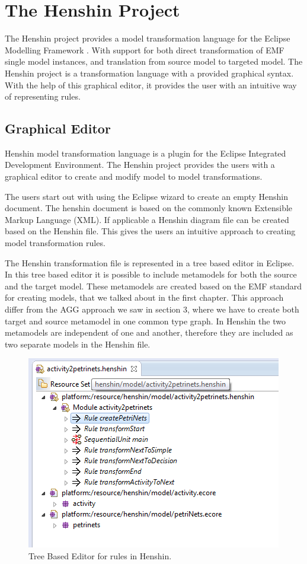 \section{The Henshin Project}

\noindent The Henshin project\cite{Henshin} provides a model transformation
language for the Eclipse Modelling Framework \cite{Steinberg2009}. With support
for both direct transformation of EMF single model instances, and translation
from source model to targeted model. The Henshin project is a transformation
language with a provided graphical syntax. With the help of this graphical
editor, it provides the user with an intuitive way of representing rules. 

\subsection{Graphical Editor}
\noindent Henshin model transformation language is a plugin for the Eclipse
Integrated Development Environment\cite{Eclipse}. The Henshin project provides
the users with a graphical editor to create and modify model to model
transformations. 

The users start out with using the Eclipse wizard to create an empty Henshin
document. The henshin document is based on the commonly known Extensible Markup
Language (XML)\cite{XML}. If applicable a Henshin diagram file can be created
based on the Henshin file. This gives the users an intuitive approach to
creating model transformation rules.

The Henshin transformation file is represented in a tree based editor in
Eclipse. In this tree based editor it is possible to include metamodels for both
the source and the target model. These metamodels are created based on the EMF
standard for creating models, that we talked about in the first chapter.
This approach differ from the AGG approach we saw in section 3, where we have
to create both target and source metamodel in one common type graph. In Henshin
the two metamodels are independent of one and another, therefore they are
included as two separate models in the Henshin file. 

\begin{figure}[H]
	\centering
	\includegraphics[scale=0.7]{figures/Henshin_TreeEdtiro.png}
	\caption{Tree Based Editor for rules in Henshin.}
	\label{fig:Henshin_TreeEditor}
\end{figure}


